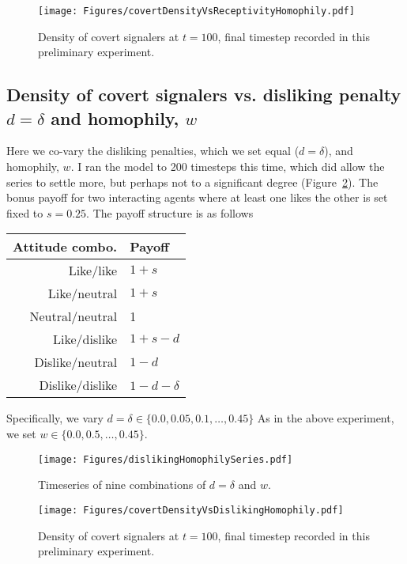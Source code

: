 \documentclass[11pt,letterpaper]{article}
\begin{document}
\begin{figure}[H]
  \centering
\texttt{[image: Figures/covertDensityVsReceptivityHomophily.pdf]}
  \caption{Density of covert signalers at $t=100$, final timestep recorded
    in this preliminary experiment.}
  \label{fig:receptivityHomophilyHeatmap}
\end{figure}


\subsection*{Density of covert signalers vs. disliking penalty $d=\delta$ and homophily, $w$}

Here we co-vary the disliking penalties, which we set equal ($d=\delta$), and
homophily, $w$. I ran the model to 200 timesteps this time, which did allow
the series to settle more, but perhaps not to a significant degree 
(Figure~\ref{fig:dislikingHomophilySeries}). The bonus payoff for two 
interacting agents where at least one
likes the other is set fixed to $s=0.25$. The payoff structure is as follows

\begin{table}[H]
  \centering
  \begin{tabular}{rl}
   Attitude combo. & Payoff \\
   \toprule
    Like/like & $1 + s$ \\
    Like/neutral & $1 + s$ \\
    Neutral/neutral & 1 \\
    Like/dislike & $1 + s - d$ \\
    Dislike/neutral & $1 - d$ \\
    Dislike/dislike & $1 - d - \delta$
  \end{tabular}
\end{table}

Specifically, we vary $d=\delta \in \{0.0, 0.05, 0.1, \ldots, 0.45\}$
As in the above experiment, we set $w \in \{0.0, 0.5, \ldots, 0.45\}$.

\begin{figure}[H]
  \centering
  \texttt{[image: Figures/dislikingHomophilySeries.pdf]}
  \caption{Timeseries of nine combinations of $d=\delta$ and $w$.}
  \label{fig:dislikingHomophilySeries}
\end{figure}

\begin{figure}[H]
  \centering
\texttt{[image: Figures/covertDensityVsDislikingHomophily.pdf]}
  \caption{Density of covert signalers at $t=100$, final timestep recorded
    in this preliminary experiment.}
  \label{fig:dislikingHomophilyHeatmap}
\end{figure}
\end{document}
